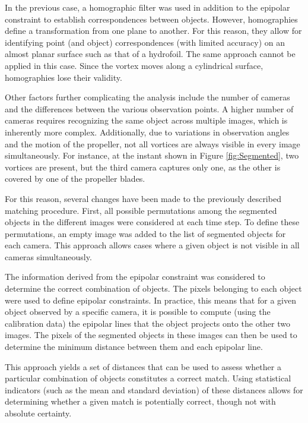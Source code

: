 In the previous case, a homographic filter was used in addition to the epipolar constraint to establish correspondences between objects.
However, homographies define a transformation from one plane to another. For this reason, they allow for identifying point (and object) correspondences (with limited accuracy) on an almost planar surface such as that of a hydrofoil.
The same approach cannot be applied in this case. Since the vortex moves along a cylindrical surface, homographies lose their validity.

Other factors further complicating the analysis include the number of cameras and the differences between the various observation points.
A higher number of cameras requires recognizing the same object across multiple images, which is inherently more complex. Additionally, due to variations in observation angles and the motion of the propeller, not all vortices are always visible in every image simultaneously.
For instance, at the instant shown in Figure \ref{fig:Segmented}, two vortices are present, but the third camera captures only one, as the other is covered by one of the propeller blades.

For this reason, several changes have been made to the previously described matching procedure.
First, all possible permutations among the segmented objects in the different images were considered at each time step.
To define these permutations, an empty image was added to the list of segmented objects for each camera. This approach allows cases where a given object is not visible in all cameras simultaneously.

The information derived from the epipolar constraint was considered to determine the correct combination of objects. The pixels belonging to each object were used to define epipolar constraints.
In practice, this means that for a given object observed by a specific camera, it is possible to compute (using the calibration data) the epipolar lines that the object projects onto the other two images. The pixels of the segmented objects in these images can then be used to determine the minimum distance between them and each epipolar line.

This approach yields a set of distances that can be used to assess whether a particular combination of objects constitutes a correct match. Using statistical indicators (such as the mean and standard deviation) of these distances allows for determining whether a given match is potentially correct, though not with absolute certainty.

